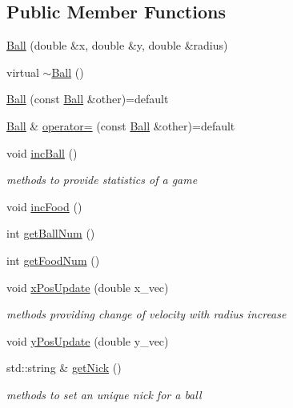 \subsection*{Public Member Functions}
\begin{DoxyCompactItemize}
\item 
\hyperlink{classwebsocket_1_1Ball_a1d933b1f878ee0bcd00e2db1b10c44c2}{Ball} (double \&x, double \&y, double \&radius)
\item 
virtual \hyperlink{classwebsocket_1_1Ball_a07e8b6854de320eeb0def600daece544}{$\sim$\+Ball} ()
\item 
\hyperlink{classwebsocket_1_1Ball_a0b3751d6c313f7bda53eb409196f7c9d}{Ball} (const \hyperlink{classwebsocket_1_1Ball}{Ball} \&other)=default
\item 
\hyperlink{classwebsocket_1_1Ball}{Ball} \& \hyperlink{classwebsocket_1_1Ball_abd82c6929644366316b7ea7b0c14e186}{operator=} (const \hyperlink{classwebsocket_1_1Ball}{Ball} \&other)=default
\item 
void \hyperlink{classwebsocket_1_1Ball_a56d1cbb94bec861ab3fa4504529bf02c}{inc\+Ball} ()
\begin{DoxyCompactList}\small\item\em methods to provide statistics of a game \end{DoxyCompactList}\item 
void \hyperlink{classwebsocket_1_1Ball_ab6f803423e713615a2c5459d8ca46a18}{inc\+Food} ()
\item 
int \hyperlink{classwebsocket_1_1Ball_a411b524d3d20241529f6dcf3ccd2da43}{get\+Ball\+Num} ()
\item 
int \hyperlink{classwebsocket_1_1Ball_a060bc9bd4aa8b138ee0d396a2c496d0c}{get\+Food\+Num} ()
\item 
void \hyperlink{classwebsocket_1_1Ball_a2ebc2a00fefeb3f2e355511cffa4aef8}{x\+Pos\+Update} (double x\+\_\+vec)
\begin{DoxyCompactList}\small\item\em methods providing change of velocity with radius increase \end{DoxyCompactList}\item 
void \hyperlink{classwebsocket_1_1Ball_a1f1dce628d5b5b5b06a93beb9bb8cca4}{y\+Pos\+Update} (double y\+\_\+vec)
\item 
std\+::string \& \hyperlink{classwebsocket_1_1Ball_a6dc2ee8009c03f1fa8913a316660e95f}{get\+Nick} ()
\begin{DoxyCompactList}\small\item\em methods to set an unique nick for a ball \end{DoxyCompactList}\item 

\end{DoxyCompactItemize}
